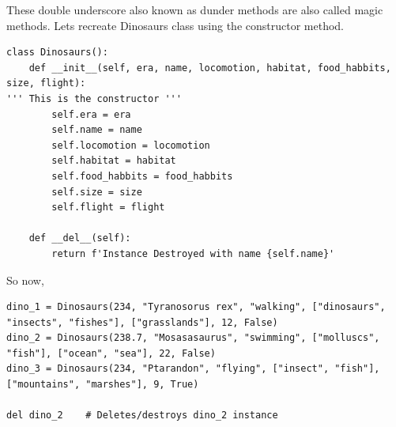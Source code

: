 \documentclass[11pt]{article}
\begin{document}
These double underscore also known as dunder methods are also called magic methods. Lets recreate Dinosaurs class using the constructor method.

\begin{verbatim}
class Dinosaurs():
    def __init__(self, era, name, locomotion, habitat, food_habbits, size, flight):
''' This is the constructor '''
        self.era = era
        self.name = name
        self.locomotion = locomotion
        self.habitat = habitat
        self.food_habbits = food_habbits
        self.size = size
        self.flight = flight

    def __del__(self):
        return f'Instance Destroyed with name {self.name}'
\end{verbatim}

So now,
\begin{verbatim}
dino_1 = Dinosaurs(234, "Tyranosorus rex", "walking", ["dinosaurs", "insects", "fishes"], ["grasslands"], 12, False)
dino_2 = Dinosaurs(238.7, "Mosasasaurus", "swimming", ["molluscs", "fish"], ["ocean", "sea"], 22, False)
dino_3 = Dinosaurs(234, "Ptarandon", "flying", ["insect", "fish"], ["mountains", "marshes"], 9, True)

del dino_2    # Deletes/destroys dino_2 instance
\end{verbatim}
\end{document}
